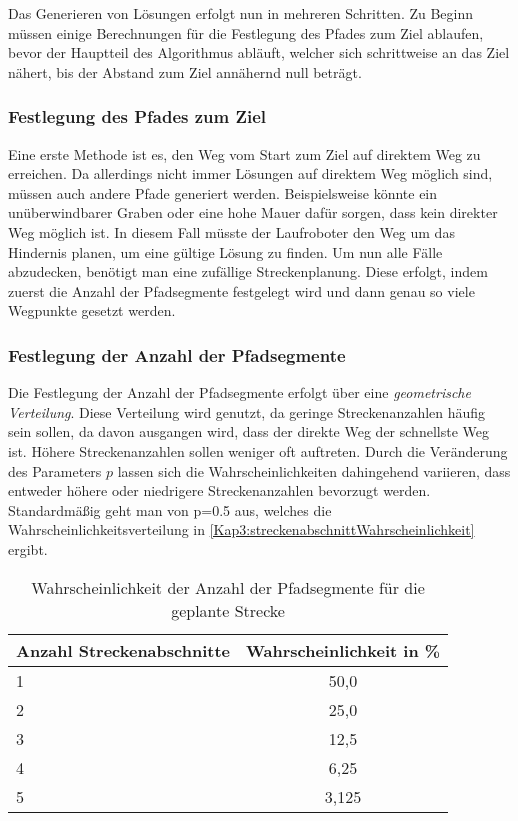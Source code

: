 Das Generieren von Lösungen erfolgt nun in mehreren Schritten. Zu Beginn müssen einige Berechnungen für die Festlegung des Pfades zum Ziel ablaufen, bevor der Hauptteil des Algorithmus abläuft, welcher sich schrittweise an das Ziel nähert, bis der Abstand zum Ziel annähernd null beträgt.

\subsubsection{Festlegung des Pfades zum Ziel}

Eine erste Methode ist es, den Weg vom Start zum Ziel auf direktem Weg zu erreichen. Da allerdings nicht immer Lösungen auf direktem Weg möglich sind, müssen auch andere Pfade generiert werden. Beispielsweise könnte ein unüberwindbarer Graben oder eine hohe Mauer dafür sorgen, dass kein direkter Weg möglich ist. In diesem Fall müsste der Laufroboter den Weg um das Hindernis planen, um eine gültige Lösung zu finden. Um nun alle Fälle abzudecken, benötigt man eine zufällige Streckenplanung. Diese erfolgt, indem zuerst die Anzahl der Pfadsegmente festgelegt wird und dann genau so viele Wegpunkte gesetzt werden.

\subsubsection{Festlegung der Anzahl der Pfadsegmente}

Die Festlegung der Anzahl der Pfadsegmente erfolgt über eine \emph{geometrische Verteilung}. Diese Verteilung wird genutzt, da geringe Streckenanzahlen häufig sein sollen, da davon ausgangen wird, dass der direkte Weg der schnellste Weg ist. Höhere Streckenanzahlen sollen weniger oft auftreten. Durch die Veränderung des Parameters $p$ lassen sich die Wahrscheinlichkeiten dahingehend variieren, dass entweder höhere oder niedrigere Streckenanzahlen bevorzugt werden. Standardmäßig geht man von p=\SI{0.5}{} aus, welches die Wahrscheinlichkeitsverteilung in \autoref{Kap3:streckenabschnittWahrscheinlichkeit} ergibt.

\begin{table}[t]
  \caption{Wahrscheinlichkeit der Anzahl der Pfadsegmente für die geplante Strecke}
  \label{Kap3:streckenabschnittWahrscheinlichkeit}
  \centering
  \sffamily
  \begin{footnotesize}
    \begin{tabular}{l S[table-format=1.3,table-comparator=true,table-space-text-post={***}]}
    \toprule
    \textbf{Anzahl Streckenabschnitte} & \textbf{Wahrscheinlichkeit in \%}\\
     & 50,0\\
    2 & 25,0\\
    3 & 12,5\\
    4 & 6,25\\
    5 & 3,125\\
    \bottomrule
    \end{tabular}
  \end{footnotesize}
  \rmfamily
\end{table}

